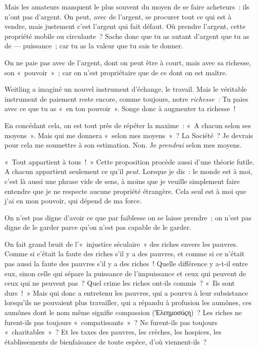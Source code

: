 \documentclass[french,twoside]{book} %
\begin{document}
Mais les amateurs manquent le plus souvent du moyen de se faire acheteurs : ils n’ont pas d’argent. On peut, avec de l’argent, se procurer tout ce qui est à vendre, mais justement c’est l’argent qui fait défaut. Où prendre l’argent, cette propriété mobile ou circulante ? Sache donc que tu as autant d’argent que tu as de — puissance ; car tu as la valeur que tu sais te donner.\par
On ne paie pas avec de l’argent, dont on peut être à court, mais avec sa richesse, son « pouvoir » ; car on n’est propriétaire que de ce dont on est maître.\par
Weitling a imaginé un nouvel instrument d’échange, le travail. Mais le véritable instrument de paiement reste encore, comme toujours, notre \emph{richesse :} Tu paies avec ce que tu as « en ton pouvoir ». Songe donc à augmenter ta richesse !\par
En concédant cela, on est tout près de répéter la maxime : « A chacun selon ses moyens ». Mais qui me donnera « selon mes moyens » ? La Société ? Je devrais pour cela me soumettre à son estimation. Non. Je \emph{prendrai} selon mes moyens.\par
« Tout appartient à tous ! » Cette proposition procède aussi d’une théorie futile. A chacun appartient seulement ce qu’il \emph{peut.} Lorsque je dis : le monde est à moi, c’est là aussi une phrase vide de sens, à moins que je veuille simplement faire entendre que je ne respecte aucune propriété étrangère. Cela seul est à moi que j’ai en mon pouvoir, qui dépend de ma force.\par
On n’est pas digne d’avoir ce que par faiblesse on se laisse prendre ; on n’est pas digne de le garder parce qu’on n’est pas capable de le garder.\par
On fait grand bruit de l’« injustice séculaire » des  riches envers les pauvres. Comme si c’était la faute des riches s’il y a des pauvres, et comme si ce n’était pas aussi la faute des pauvres s’il y a des riches ! Quelle différence y a-t-il entre eux, sinon celle qui sépare la puissance de l’impuissance et ceux qui peuvent de ceux qui ne peuvent pas ? Quel crime les riches ont-ils commis ? « Ils sont durs ! » Mais qui donc a entretenu les pauvres, qui a pourvu à leur subsistance lorsqu’ils ne pouvaient plus travailler, qui a répandu à profusion les aumônes, ces aumônes dont le nom même signifie compassion (Ἐλεημοσύϛη) ? Les riches ne furent-ils pas toujours « compatissants » ? Ne furent-ils pas toujours « charitables » ? Et les taxes des pauvres, les crèches, les hospices, les établissements de bienfaisance de toute espèce, d’où viennent-ils ?\par
\end{document}
